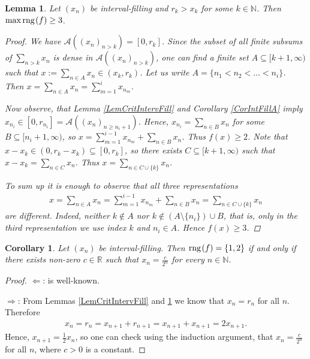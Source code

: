 \documentclass{amsart}
\newtheorem{lemma}[theorem]{Lemma}
\newtheorem{corollary}[theorem]{Corollary}
\theoremstyle{definition}
\newcommand{\rng}{{\rm rng} \hspace{0.03cm}}
\begin{document}
\begin{lemma}\label{conajmniejtrzykrotny}
Let $(x_n)$ be interval-filling and $r_k>x_k$ for some $k\in\mathbb{N}$. Then $\max \rng(f)\geq 3$. 
\begin{proof}
We have $\mathcal{A}((x_n)_{n>k})=[0,r_k]$. Since the subset of all finite subsums of $\sum_{n>k} x_n$ is dense in $\mathcal{A}((x_n)_{n>k})$, one can find a finite set $A\subseteq [k+1,\infty)$ such that $x:=\sum_{n\in A} x_n \in (x_k, r_k)$. Let us write $A=\{n_1<n_2<\ldots<n_i\}$. Then $x= \sum_{n\in A} x_n =\sum_{m=1}^{i} x_{n_m}$. 

Now observe, that Lemma \ref{LemCritIntervFill} and Corollary \ref{CorIntFillA} imply $x_{n_{i}}\in [0,r_{n_{i}}] = \mathcal{A}((x_{n})_{n\geq n_{i}+1})$. Hence, $x_{n_i}=\sum_{n\in B}x_n$ for some $B\subseteq [n_i+1,\infty)$, so $x=  \sum_{m=1}^{i-1} x_{n_m}+\sum_{n\in B}x_n$. Thus $f(x)\geq 2$. Note that $x-x_k\in (0,r_k-x_k)\subseteq [0,r_k]$, so there exists $C\subseteq  [k+1,\infty)$  such that $x-x_k=\sum_{n\in C} x_n$. Thus $x=\sum_{n\in C\cup\{k\}} x_n$. 

To sum up it is enough to observe that all three representations
\begin{align*}
x=\sum_{n\in A} x_n=\sum_{m=1}^{i-1} x_{n_m}+\sum_{n\in B}x_n=\sum_{n\in C\cup\{k\}} x_n
\end{align*}
are different. Indeed, neither $k\notin A$ nor $k\notin (A\setminus\{n_i\})\cup B$, that is, only in the third representation we use index $k$ and $n_i\in A$. Hence $f(x)\geq 3$.
\end{proof}
\end{lemma}

\begin{corollary}\label{CorSet(1,2)}
Let $(x_n)$ be interval-filling. Then $\rng(f)=\{1,2\}$ if and only if  there exists non-zero $c\in\mathbb{R}$ such that $x_n=\frac{c}{2^n}$ for every $n\in\mathbb{N}$. 
\end{corollary} 
\begin{proof}
$\Leftarrow$: is well-known. 

$\Rightarrow$: From Lemmas \ref{LemCritIntervFill} and \ref{conajmniejtrzykrotny} we know that $x_{n}=r_{n}$ for all $n$. Therefore
\begin{align*}
x_{n} = r_{n} = x_{n+1} + r_{n+1} = x_{n+1} + x_{n+1} = 2x_{n+1}.
\end{align*}
Hence, $x_{n+1}=\frac{1}{2}x_{n}$, so one can check using the induction argument, that $x_{n}=\frac{c}{2^{n}}$ for all $n$, where $c>0$ is a constant.
\end{proof}
\end{document}
